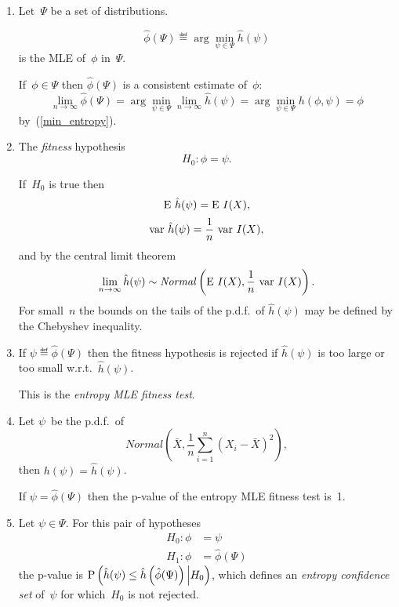 \documentclass[10pt,a4paper]{article}
\theoremstyle{plain} \newtheorem{Lem}{Lemma}
\begin{document}
\begin{enumerate}
\item
Let~$\Psi$ be a set of distributions.

$$ \hat \phi(\Psi) \eqdef \arg \min_{\psi \in \Psi} \hat h(\psi) $$
is the MLE of~$\phi$ in~$\Psi$.

If~$\phi \in \Psi$ then $\hat \phi(\Psi)$ is a consistent estimate of~$\phi$:
$$ \lim_{n \to \infty} \hat \phi(\Psi) = \arg \min_{\psi \in \Psi} \lim_{n \to \infty} \hat h(\psi) = \arg \min_{\psi \in \Psi} h(\phi,\psi) = \phi $$
by~(\ref{min_entropy}).

\item
The {\em fitness} hypothesis 
$$ H_0: \phi = \psi. $$

If~$H_0$ is true then 
$$ \E \hat h(\psi) = \E I (X), $$
$$ \var \hat h(\psi) = \frac 1 n \ \var I(X), $$
and by the central limit theorem
$$\lim_{n \to \infty} \hat h(\psi) \sim \mathit{Normal} \left(\E I (X), \frac 1 n \ \var I(X) \right).$$
For small~$n$ the bounds on the tails of the p.d.f.~of $\hat h(\psi)$ may be defined by the Chebyshev inequality.

\item
If $\psi \eqdef \hat \phi(\Psi)$ then 
the fitness hypothesis is rejected if $\hat h(\psi)$ is too large or too small w.r.t.~$\hat h(\psi)$.

This is the {\em entropy MLE fitness test}.

\item 
Let $\psi$~be the p.d.f.~of $$\mathit{Normal} \left(\bar X, \frac 1 n \sum_{i=1}^n (X_i - \bar X)^2 \right), $$
then $h(\psi) = \hat h(\psi)$.

If $\psi = \hat \phi(\Psi)$ then the p-value of the entropy MLE fitness test is~1.

\item
Let $\psi \in \Psi$.
For this pair of hypotheses
\begin{equation*}
\begin{split}
H_0: \phi &= \psi \\
H_1: \phi &= \hat \phi(\Psi) 
\end{split}
\end{equation*}
the p-value is $\P \left(\hat h(\psi) \le \hat h \left(\hat \phi(\Psi) \right) \Big| H_0 \right)$,
which defines an {\em entropy confidence set} of~$\psi$ for which~$H_0$ is not rejected.


\end{enumerate}
\end{document}

